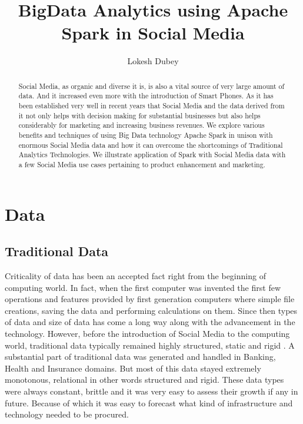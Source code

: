 \documentclass[sigconf]{acmart}
\begin{document}
\title{BigData Analytics using Apache Spark in Social Media}


\author{Lokesh Dubey}

\renewcommand{\shortauthors}{L. Dubey}


\begin{abstract}
Social Media, as organic and diverse it is, is also a vital source of very large amount of data. And it increased even more with the introduction of Smart Phones. As it has been established very well in recent years that Social Media and the data derived from it not only helps with decision making for substantial businesses but also helps considerably for marketing and increasing business revenues. We explore various benefits and techniques of using Big Data technology Apache Spark in unison with enormous Social Media data and how it can overcome the shortcomings of Traditional Analytics Technologies. We illustrate application of Spark with Social Media data with a few Social Media use cases pertaining to product enhancement and marketing.
\end{abstract}



\maketitle

\section{Data}
\subsection{Traditional Data}

Criticality of data has been an accepted fact right from the beginning of computing world. In fact, when the first computer was invented the first few operations and features provided by first generation computers where simple file creations, saving the data and performing calculations on them. Since then types of data and size of data has come a long way along with the advancement in the technology. However, before the introduction of Social Media to the computing world, traditional data typically remained highly structured, static and rigid \cite{georgevirthadoop}. A substantial part of traditional data was generated and handled in Banking, Health and Insurance domains. But most of this data stayed extremely monotonous, relational in other words structured and rigid. These data types were always constant, brittle and it was very easy to assess their growth if any in future. Because of which it was easy to forecast what kind of infrastructure and technology needed to be procured.
\end{document}
